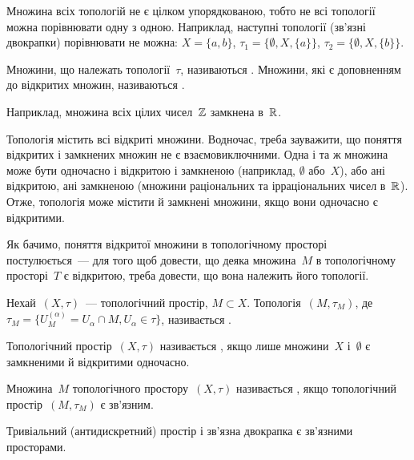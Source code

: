 \begin{remark}
    Множина всіх топологій не є цілком упорядкованою, тобто не всі топології можна порівнювати одну з одною. Наприклад, наступні топології (зв'язні двокрапки) порівнювати не можна: $X = \{a, b\}$, $\tau_1 = \{\emptyset, X, \{a\}\}$, $\tau_2 = \{\emptyset, X, \{b\}\}$.
\end{remark}

\begin{definition}
    Множини, що належать топології~$\tau$, називаються . Множини, які є доповненням до відкритих множин, називаються .
\end{definition}

Наприклад, множина всіх цілих чисел~$\mathbb{Z}$ замкнена в~$\mathbb{R}$.

\begin{remark}
    Топологія містить всі відкриті множини. Водночас, треба зауважити, що поняття відкритих і замкнених множин не є взаємовиключними. Одна і та ж множина може бути одночасно і відкритою і замкненою (наприклад, $\emptyset$ або~$X$), або ані відкритою, ані замкненою (множини раціональних та ірраціональних чисел в~$\mathbb{R}$). Отже, топологія може містити й замкнені множини, якщо вони одночасно є відкритими.
\end{remark}

Як бачимо, поняття відкритої множини в топологічному просторі постулюється~--- для того щоб довести, що деяка множина~$M$ в топологічному просторі~$T$ є відкритою, треба довести, що вона належить його топології.

\begin{definition}
    Нехай~$(X, \tau)$~--- топологічний простір, $M \subset X$. Топологія~$(M, \tau_M)$, де~$\tau_M = \{ U_M^{(\alpha)} = U_\alpha \cap M, U_\alpha \in \tau\}$, називається .
\end{definition}

\begin{definition}
    Топологічний простір~$(X, \tau)$ називається , якщо лише множини~$X$ і~$\emptyset$ є замкненими й відкритими одночасно.
\end{definition}

\begin{definition}
    Множина~$M$ топологічного простору~$(X, \tau)$ називається , якщо топологічний простір~$(M, \tau_M)$ є зв'язним.
\end{definition}

\begin{example}
    Тривіальний (антидискретний) простір і зв'язна двокрапка є зв'яз\-ними просторами.
\end{example}

